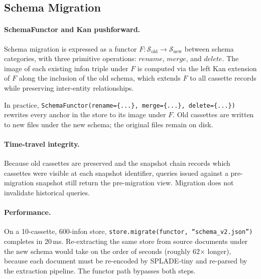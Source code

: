 \subsection{Schema Migration}
\label{sec:architecture:migration}

\paragraph{SchemaFunctor and Kan pushforward.}
Schema migration is expressed as a functor
$F \colon \mathcal{S}_{\text{old}} \to \mathcal{S}_{\text{new}}$ between
schema categories, with three primitive operations:
$\mathit{rename}$, $\mathit{merge}$, and $\mathit{delete}$.  The image of
each existing infon triple under $F$ is computed via the left Kan extension
of $F$ along the inclusion of the old schema, which extends $F$ to all
cassette records while preserving inter-entity relationships.

In practice, \texttt{SchemaFunctor(rename=\{...\}, merge=\{...\},
delete=\{...\})} rewrites every anchor in the store to its image under $F$.
Old cassettes are written to new files under the new schema; the original
files remain on disk.

\paragraph{Time-travel integrity.}
Because old cassettes are preserved and the snapshot chain records which
cassettes were visible at each snapshot identifier, queries issued against a
pre-migration snapshot still return the pre-migration view.  Migration does not
invalidate historical queries.

\paragraph{Performance.}
On a 10-cassette, 600-infon store, \texttt{store.migrate(functor,
``schema\_v2.json'')} completes in 20\,ms.  Re-extracting the same store from
source documents under the new schema would take on the order of seconds
(roughly 62$\times$ longer), because each document must be re-encoded by
SPLADE-tiny and re-parsed by the extraction pipeline.  The functor path
bypasses both steps.
